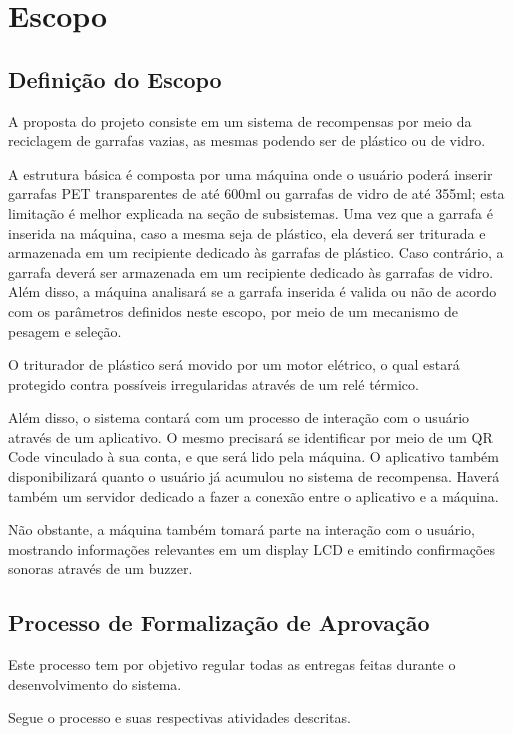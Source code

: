 \section{Escopo}
\subsection{Definição do Escopo}
    A proposta do projeto consiste em um sistema de recompensas por meio da reciclagem de garrafas vazias, as mesmas podendo ser de plástico ou de vidro.

    A estrutura básica é composta por uma máquina onde o usuário poderá inserir garrafas PET transparentes de até 600ml ou garrafas de vidro de até 355ml; esta limitação é melhor explicada na seção de subsistemas. Uma vez que a garrafa é inserida na máquina, caso a mesma seja de plástico, ela deverá ser triturada e armazenada em um recipiente dedicado às garrafas de plástico. Caso contrário, a garrafa deverá ser armazenada em um recipiente dedicado às garrafas de vidro. Além disso, a máquina analisará se a garrafa inserida é valida ou não de acordo com os parâmetros definidos neste escopo, por meio de um mecanismo de pesagem e seleção.

    O triturador de plástico será movido por um motor elétrico, o qual estará protegido contra possíveis irregularidas através de um relé térmico. 

    Além disso, o sistema contará com um processo de interação com o usuário através de um aplicativo. O mesmo precisará se identificar por meio de um QR Code vinculado à sua conta, e que será lido pela máquina. O aplicativo também disponibilizará quanto o usuário já acumulou no sistema de recompensa. Haverá também um servidor dedicado a fazer a conexão entre o aplicativo e a máquina.

    Não obstante, a máquina também tomará parte na interação com o usuário, mostrando informações relevantes em um display LCD e emitindo confirmações sonoras através de um buzzer.

\subsection{Processo de Formalização de Aprovação}
    Este processo tem por objetivo regular todas as entregas feitas durante o desenvolvimento do sistema.

    Segue o processo e suas respectivas atividades descritas.


